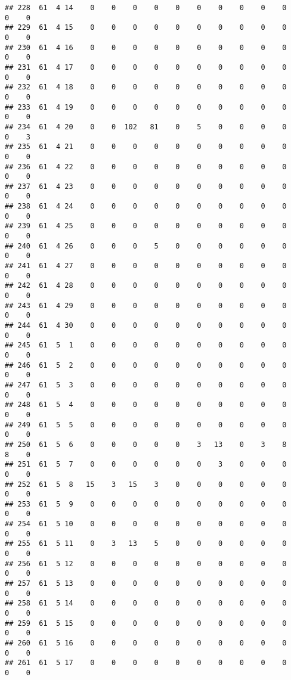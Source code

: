 \documentclass[]{article}
\begin{document}
\begin{verbatim}
## 228  61  4 14    0    0    0    0    0    0    0    0    0    0    0    0
## 229  61  4 15    0    0    0    0    0    0    0    0    0    0    0    0
## 230  61  4 16    0    0    0    0    0    0    0    0    0    0    0    0
## 231  61  4 17    0    0    0    0    0    0    0    0    0    0    0    0
## 232  61  4 18    0    0    0    0    0    0    0    0    0    0    0    0
## 233  61  4 19    0    0    0    0    0    0    0    0    0    0    0    0
## 234  61  4 20    0    0  102   81    0    5    0    0    0    0    0    3
## 235  61  4 21    0    0    0    0    0    0    0    0    0    0    0    0
## 236  61  4 22    0    0    0    0    0    0    0    0    0    0    0    0
## 237  61  4 23    0    0    0    0    0    0    0    0    0    0    0    0
## 238  61  4 24    0    0    0    0    0    0    0    0    0    0    0    0
## 239  61  4 25    0    0    0    0    0    0    0    0    0    0    0    0
## 240  61  4 26    0    0    0    5    0    0    0    0    0    0    0    0
## 241  61  4 27    0    0    0    0    0    0    0    0    0    0    0    0
## 242  61  4 28    0    0    0    0    0    0    0    0    0    0    0    0
## 243  61  4 29    0    0    0    0    0    0    0    0    0    0    0    0
## 244  61  4 30    0    0    0    0    0    0    0    0    0    0    0    0
## 245  61  5  1    0    0    0    0    0    0    0    0    0    0    0    0
## 246  61  5  2    0    0    0    0    0    0    0    0    0    0    0    0
## 247  61  5  3    0    0    0    0    0    0    0    0    0    0    0    0
## 248  61  5  4    0    0    0    0    0    0    0    0    0    0    0    0
## 249  61  5  5    0    0    0    0    0    0    0    0    0    0    0    0
## 250  61  5  6    0    0    0    0    0    3   13    0    3    8    8    0
## 251  61  5  7    0    0    0    0    0    0    3    0    0    0    0    0
## 252  61  5  8   15    3   15    3    0    0    0    0    0    0    0    0
## 253  61  5  9    0    0    0    0    0    0    0    0    0    0    0    0
## 254  61  5 10    0    0    0    0    0    0    0    0    0    0    0    0
## 255  61  5 11    0    3   13    5    0    0    0    0    0    0    0    0
## 256  61  5 12    0    0    0    0    0    0    0    0    0    0    0    0
## 257  61  5 13    0    0    0    0    0    0    0    0    0    0    0    0
## 258  61  5 14    0    0    0    0    0    0    0    0    0    0    0    0
## 259  61  5 15    0    0    0    0    0    0    0    0    0    0    0    0
## 260  61  5 16    0    0    0    0    0    0    0    0    0    0    0    0
## 261  61  5 17    0    0    0    0    0    0    0    0    0    0    0    0

\end{verbatim}
\end{document}
